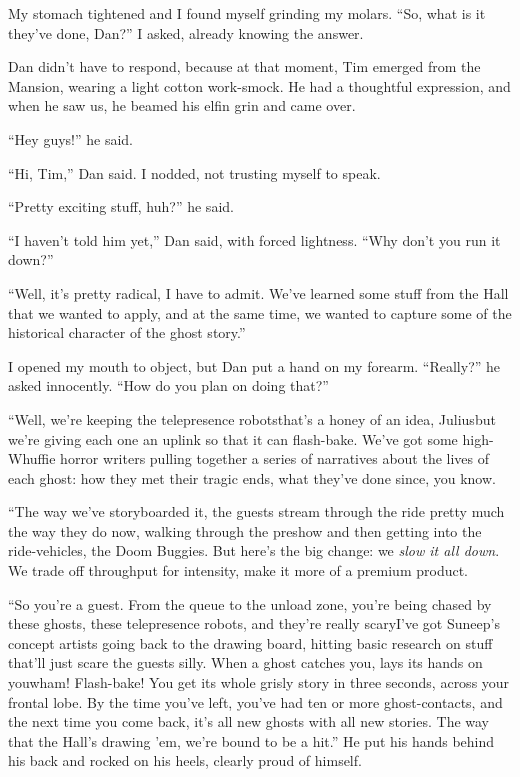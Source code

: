 My stomach tightened and I found myself grinding my molars. “So,
what is it they've done, Dan?” I asked, already knowing the
answer.

Dan didn't have to respond, because at that moment, Tim emerged
from the Mansion, wearing a light cotton work-smock. He had a
thoughtful expression, and when he saw us, he beamed his elfin grin
and came over.

“Hey guys!” he said.

“Hi, Tim,” Dan said. I nodded, not trusting myself to speak.

“Pretty exciting stuff, huh?” he said.

“I haven't told him yet,” Dan said, with forced lightness. “Why
don't you run it down?”

“Well, it's pretty radical, I have to admit. We've learned some
stuff from the Hall that we wanted to apply, and at the same time,
we wanted to capture some of the historical character of the ghost
story.”

I opened my mouth to object, but Dan put a hand on my forearm.
“Really?” he asked innocently. “How do you plan on doing that?”

“Well, we're keeping the telepresence robots{\dash}that's a honey of an
idea, Julius{\dash}but we're giving each one an uplink so that it can
flash-bake. We've got some high-Whuffie horror writers pulling
together a series of narratives about the lives of each ghost: how
they met their tragic ends, what they've done since, you know.

“The way we've storyboarded it, the guests stream through the ride
pretty much the way they do now, walking through the preshow and
then getting into the ride-vehicles, the Doom Buggies. But here's
the big change: we \emph{slow it all down}. We trade off throughput
for intensity, make it more of a premium product.

“So you're a guest. From the queue to the unload zone, you're being
chased by these ghosts, these telepresence ro\-bots, and they're
really scary{\dash}I've got Suneep's concept artists going back to the
drawing board, hitting basic research on stuff that'll just scare
the guests silly. When a ghost catches you, lays its hands on
you{\dash}wham! Flash-bake! You get its whole grisly story in three
seconds, across your frontal lobe. By the time you've left, you've
had ten or more ghost-contacts, and the next time you come back,
it's all new ghosts with all new stories. The way that the Hall's
drawing 'em, we're bound to be a hit.” He put his hands behind his
back and rocked on his heels, clearly proud of himself.

